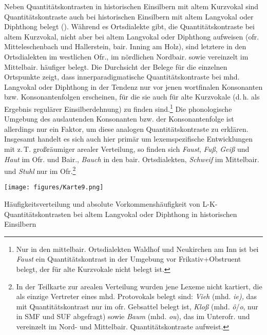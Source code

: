 Neben Quantitätskontrasten in historischen Einsilbern mit altem Kurzvokal sind Quantitätskontraste auch bei historischen Einsilbern mit altem Langvokal oder Diphthong belegt (). Während es Ortsdialekte gibt, die Quantitätskontraste bei altem Kurzvokal, nicht aber bei altem Langvokal oder Diphthong aufweisen (ofr. Mitteleschenbach und Hallerstein, bair. Inning am Holz), sind letztere in den Ortsdialekten im westlichen Ofr., im nördlichen Nordbair. sowie vereinzelt im Mittelbair. häufiger belegt. Die Durchsicht der Belege für die einzelnen Ortspunkte zeigt, dass innerparadigmatische Quantitätskontraste bei mhd. Langvokal oder Diphthong in der Tendenz nur vor jenen wortfinalen Konsonanten bzw. Konsonantenfolgen erscheinen, für die sie auch für alte Kurzvokale (d.\,h. als Ergebnis regulärer Einsilberdehnung) zu finden sind.\footnote{Nur in den mittelbair. Ortsdialekten Waldhof und Neukirchen am Inn ist bei \textit{Faust} ein Quantitätskontrast in der Umgebung vor Frikativ+Obstruent belegt, der für alte Kurzvokale nicht belegt ist.} Die phonologische Umgebung des auslautenden Konsonanten bzw. der Konsonantenfolge ist allerdings nur ein Faktor, um diese analogen Quantitätskontraste zu erklären. Insgesamt handelt es sich auch hier primär um lexemspezifische Entwicklungen mit z.\,T. großräumiger arealer Verteilung, so finden sich \textit{Faust}, \textit{Fuß}, \textit{Geiß}{ }und \textit{Haut} im Ofr. und Bair., \textit{Bauch} in den bair. Ortsdialekten, \textit{Schweif} im Mittelbair. und \textit{Stuhl} nur im Ofr.\footnote{In der Teilkarte zur arealen Verteilung wurden jene Lexeme nicht kartiert, die als einzige Vertreter eines mhd. Protovokals belegt sind: \textit{Vieh} (mhd. \textit{ie),} das mit Quantitätskontrast nur im ofr. Gebsattel belegt ist, \textit{Kloß} (mhd. \textit{ô}/\textit{o}, nur in SMF und SUF abgefragt) sowie \textit{Baum} (mhd. \textit{ou}), das im Unterofr. und vereinzelt im Nord- und Mittelbair. Quantitätskontraste aufweist.}


\begin{map}
\texttt{[image: figures/Karte9.png]}
\caption{Häufigkeitsverteilung und absolute Vorkommenshäufigkeit von L-K-Quantitätskontrasten bei altem Langvokal oder Diphthong in historischen Einsilbern}
\label{map:9}
\end{map}

